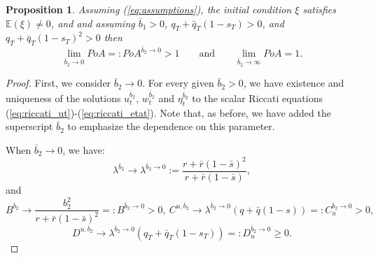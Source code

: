 \documentclass[11pt]{article}
\newtheorem{proposition}{Proposition}
\begin{document}
\begin{proposition}
	Assuming (\ref{eq:assumptions}), the initial condition $\xi$ satisfies $\mathbb{E}(\xi)\neq 0$, and and assuming $\bar{b}_1> 0$, $q_T+\bar{q}_T(1-s_T)>0$, and $q_T+\bar{q}_T(1-s_T)^2>0$
	then 
	\begin{equation*}
	\lim_{\bar{b}_2 \to 0} PoA =: PoA^{\bar{b}_2\to 0} > 1\qquad \text{and} \qquad\lim_{\bar{b}_2 \to \infty} PoA = 1.
	\end{equation*}
	\label{prop:b2bar}
\end{proposition}
\begin{proof}
	First, we consider $\bar{b}_2 \to 0$. For every given $\bar{b}_2 >0$, we have existence and uniqueness of the solutions $u^{\bar{b}_2}_t$, $w^{\bar{b}_2}_t$ and $\eta^{\bar{b}_2}_t$ to the scalar Riccati equations (\ref{eq:riccati_ut})-(\ref{eq:riccati_etat}). Note that, as before, we have added the superscript $\bar{b}_2$ to emphasize the dependence on this parameter.
	
	When $\bar{b}_2 \to 0$, we have:
	$$\displaystyle \lambda^{\bar{b}_2} \to \lambda^{\bar{b}_2 \to 0} := \frac{r + \bar{r}(1- \bar{s})^2}{r + \bar{r}(1-\bar{s})},$$
	and 
	$$B^{\bar{b}_2} \to \frac{b_2^2}{r + \bar{r}(1-\bar{s})^2}=:B^{\bar{b}_2 \to 0} > 0,\ C^{u,\bar{b}_2} \to \lambda^{\bar{b}_2 \to 0}(q+\bar{q}(1-s))=:C^{\bar{b}_2 \to 0}_u >0,$$
	$$D^{u,\bar{b}_2} \to \lambda^{\bar{b}_2 \to 0}(q_T+\bar{q}_T(1-s_T))=:D^{\bar{b}_2 \to 0}_u \geq 0.$$
	

\end{proof}
\end{document}
